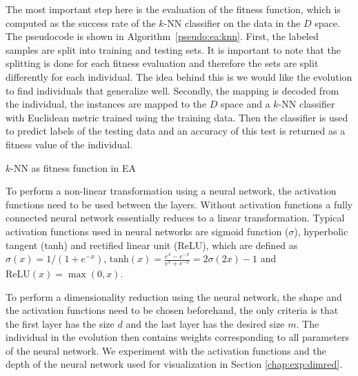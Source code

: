The most important step here is the evaluation of the fitness function, which is computed as the success rate of the $k$-NN classifier on the data in the $D$ space. The pseudocode is shown in Algorithm~\ref{pseudo:ea:knn}. First, the labeled samples are split into training and testing sets. It is important to note that the splitting is done for each fitness evaluation and therefore the sets are split differently for each individual. The idea behind this is we would like the evolution to find individuals that generalize well. Secondly, the mapping is decoded from the individual, the instances are mapped to the $D$ space and a $k$-NN classifier with Euclidean metric trained using the training data. Then the classifier is used to predict labels of the testing data and an accuracy of this test is returned as a fitness value of the individual.

\begin{algorithm}[t]
\caption{$k$-NN as fitness function in EA} \label{pseudo:ea:knn}
\DontPrintSemicolon
\LinesNumbered
{}
\end{algorithm} 

To perform a non-linear transformation using a neural network, the activation functions need to be used between the layers. Without activation functions a fully connected neural network essentially reduces to a linear transformation. Typical activation functions used in neural networks are sigmoid function ($\sigma$), hyperbolic tangent (tanh) and rectified linear unit (ReLU), which are defined as $\sigma(x) = 1/(1+e^{-x})$, $\text{tanh}(x) = \frac{e^x-e^{-x}}{e^x+e^{-x}} = 2\sigma(2x)-1$ and $\text{ReLU}(x) = \max(0,x)$.

To perform a dimensionality reduction using the neural network, the shape and the activation functions need to be chosen beforehand, the only criteria is that the first layer has the size $d$ and the last layer has the desired size $m$. The individual in the evolution then contains weights corresponding to all parameters of the neural network. We experiment with the activation functions and the depth of the neural network used for visualization in Section \ref{chap:exp:dimred}.

